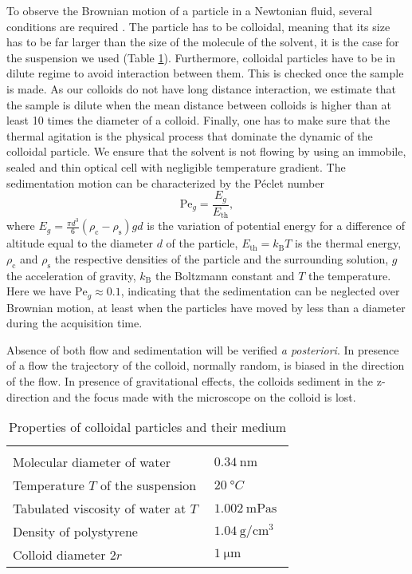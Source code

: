 \documentclass[%
 aip,
 jmp,%
 amsmath,amssymb,
reprint,%
]{revtex4-1}
\begin{document}
To observe the Brownian motion of a particle in a Newtonian fluid, several conditions are required \citep{16_CollSusp}. The particle has to be colloidal, meaning that its size has to be far larger than the size of the molecule of the solvent, it is the case for the suspension we used (Table \ref{TabParams}). Furthermore, colloidal particles have to be in dilute regime to avoid interaction between them. This is checked once the sample is made. As our colloids do not have long distance interaction, we estimate that the sample is dilute when the mean distance between colloids is higher than at least 10 times the diameter of a colloid. Finally, one has to make sure that the thermal agitation is the physical process that dominate the dynamic of the colloidal particle. We ensure that the solvent is not flowing by using an immobile, sealed and thin optical cell with negligible temperature gradient. The sedimentation motion can be characterized by the P\'eclet number \citep{12_patankar1980numerical}
\begin{equation}
\text{Pe}_g = \frac{E_g}{E_\text{th}},
\end{equation}
where $E_g = \frac{\pi d^3}{6}  (\rho_\text{c} - \rho_\text{s}) g  d$ is the variation of potential energy for a difference of altitude equal to the diameter $d$ of the particle, $E_\text{th} = k_\text{B} T$ is the thermal energy, $\rho_\text{c}$ and $\rho_\text{s}$ the respective densities of the particle and the surrounding solution, $g$ the acceleration of gravity, $k_\text{B}$ the Boltzmann constant and $T$ the temperature. Here we have $\text{Pe}_g \approx 0.1$, indicating that the sedimentation can be neglected over Brownian motion, at least when the particles have moved by less than a diameter during the acquisition time.


Absence of both flow and sedimentation will be verified \textit{a posteriori}. In presence of a flow the trajectory of the colloid, normally random, is biased in the direction of the flow. In presence of gravitational effects, the colloids sediment in the z-direction and the focus made with the microscope on the colloid is lost. 

\begin{table}
\begin{tabular}{m{0.7\linewidth}m{0.28\linewidth}}
  \hline\\[-0.8em]
  Molecular diameter of water \citep{17_marcus1998properties}  & $\SI{0.34}{\nano\meter}$\\
  Temperature $T$ of the suspension & $\SI{20}{\degree C}$ \\
  Tabulated viscosity of water at $T$ & $\SI{1.002}{\milli\pascal\second}$ \\
  Density of polystyrene & $\SI{1.04}{\gram\per\centi\meter\cubed}$ \\
  Colloid diameter $2r$ & $\SI{1}{\micro\meter}$\\
  \hline
  \end{tabular}
  \caption{Properties of colloidal particles and their medium}
  \label{TabParams}
\end{table}
\end{document}
